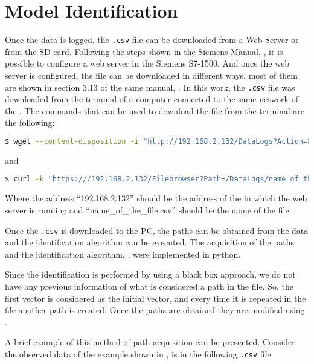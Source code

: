 \section{Model Identification}
\label{sec:modIdent}
 Once the data is logged, the \verb|.csv| file can be downloaded from a Web Server or from the SD card. Following the steps shown in the Siemens Manual,
\cite{webserverSiemens}, it is possible to configure a web server in the Siemens
\PLC{} S7-1500. And once the web server is configured, the file can be downloaded in different
ways, most of them are shown in section 3.13 of the same manual, \cite{webserverSiemens}. In this work, the \verb|.csv| file was downloaded from the terminal of a computer connected to the same network of the \PLC{}.
The commands that can be used to download the file from the terminal are the following:
\vspace{-1cm}
\begin{lstlisting}[language=bash,numbers=none]
  $ wget --content-disposition -i "http://192.168.2.132/DataLogs?Action=LIST"
\end{lstlisting}
and
\vspace{-1cm}
\begin{lstlisting}[language=bash,numbers=none]
  $ curl -k "https:///192.168.2.132/Filebrowser?Path=/DataLogs/name_of_the_file.csv&RAW" -H "Referer: https://192.168.2.132/Portal/Portal.mwsl?PriNav=Filebrowser&Path=/DataLogs/"
\end{lstlisting}
Where the address ``192.168.2.132'' should be the address of the \PLC{} in which
the web server is running and ``name\_of\_the\_file.csv'' should be the name of the file.

Once the \verb|.csv| is downloaded to the PC, the paths can be obtained from the data and the identification algorithm can
be executed. The acquisition of the paths and the identification algorithm, , were
implemented in python.

Since the identification is
performed by using a black box approach, we do not have any previous information of what is
considered a path in the file. So, the first vector is considered as the initial
vector, and every time it is repeated in the file another path is created.
Once the paths are obtained they are modified using .

A brief example of this method of path acquisition can be presented. Consider the observed data of the example shown in , is in the following
\verb|.csv| file:

